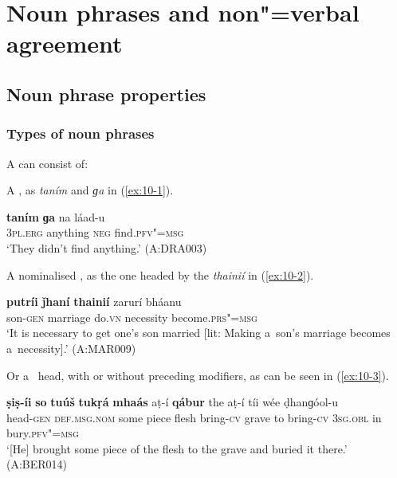 \chapter{Noun phrases and non"=verbal agreement}
\label{chap:10}


\section{Noun {phrase} properties}
\label{sec:10-1}

\subsection{Types of {noun} phrases}
\label{subsec:10-1-1}


A   can consist of: 


A , as \textit{taním} and \textit{ɡa} in (\ref{ex:10-1}).

\begin{exe}
\ex
\label{ex:10-1}
\gll \textbf{taním} \textbf{ɡa} na láad-u  \\
\textsc{3pl.erg} anything \textsc{neg} find.\textsc{pfv"=msg} \\
\glt `They didn't find anything.' (A:DRA003)
\end{exe}

A nominalised , as the one headed by the  \textit{thainií} in (\ref{ex:10-2}).

\begin{exe}
\ex
\label{ex:10-2}
\gll \textbf{putríi} \textbf{ǰhaní} \textbf{thainií} zarurí bháanu \\
son-\textsc{gen} marriage do.\textsc{vn} necessity become.\textsc{prs"=msg}  \\
\glt `It is necessary to get one's son married [lit: Making a~son's marriage becomes a~necessity].' (A:MAR009)
\end{exe}

Or a~ head, with or without preceding modifiers, as can be seen in (\ref{ex:10-3}).

\begin{exe}
\ex
\label{ex:10-3}
\gll \textbf{ṣiṣ-íi} \textbf{so} \textbf{tuúš} \textbf{tukṛá} \textbf{mhaás} aṭ-í \textbf{qábur} the aṭ-í tíi wée ḍhanɡóol-u \\
head-\textsc{gen} \textsc{def.msg.nom} some piece flesh bring-\textsc{cv} grave  to bring-\textsc{cv} \textsc{3sg.obl} in bury.\textsc{pfv"=msg}  \\
\glt `[He] brought some piece of the flesh to the grave and buried it there.' (A:BER014)
\end{exe}

